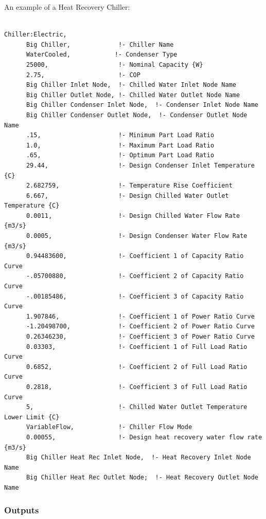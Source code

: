 An example of a Heat Recovery Chiller:

\begin{lstlisting}

Chiller:Electric,
      Big Chiller,             !- Chiller Name
      WaterCooled,            !- Condenser Type
      25000,                   !- Nominal Capacity {W}
      2.75,                    !- COP
      Big Chiller Inlet Node,  !- Chilled Water Inlet Node Name
      Big Chiller Outlet Node, !- Chilled Water Outlet Node Name
      Big Chiller Condenser Inlet Node,  !- Condenser Inlet Node Name
      Big Chiller Condenser Outlet Node,  !- Condenser Outlet Node Name
      .15,                     !- Minimum Part Load Ratio
      1.0,                     !- Maximum Part Load Ratio
      .65,                     !- Optimum Part Load Ratio
      29.44,                   !- Design Condenser Inlet Temperature {C}
      2.682759,                !- Temperature Rise Coefficient
      6.667,                   !- Design Chilled Water Outlet Temperature {C}
      0.0011,                  !- Design Chilled Water Flow Rate {m3/s}
      0.0005,                  !- Design Condenser Water Flow Rate {m3/s}
      0.94483600,              !- Coefficient 1 of Capacity Ratio Curve
      -.05700880,              !- Coefficient 2 of Capacity Ratio Curve
      -.00185486,              !- Coefficient 3 of Capacity Ratio Curve
      1.907846,                !- Coefficient 1 of Power Ratio Curve
      -1.20498700,             !- Coefficient 2 of Power Ratio Curve
      0.26346230,              !- Coefficient 3 of Power Ratio Curve
      0.03303,                 !- Coefficient 1 of Full Load Ratio Curve
      0.6852,                  !- Coefficient 2 of Full Load Ratio Curve
      0.2818,                  !- Coefficient 3 of Full Load Ratio Curve
      5,                       !- Chilled Water Outlet Temperature Lower Limit {C}
      VariableFlow,            !- Chiller Flow Mode
      0.00055,                 !- Design heat recovery water flow rate {m3/s}
      Big Chiller Heat Rec Inlet Node,  !- Heat Recovery Inlet Node Name
      Big Chiller Heat Rec Outlet Node;  !- Heat Recovery Outlet Node Name
\end{lstlisting}

\subsubsection{Outputs}\label{outputs-3-013}

